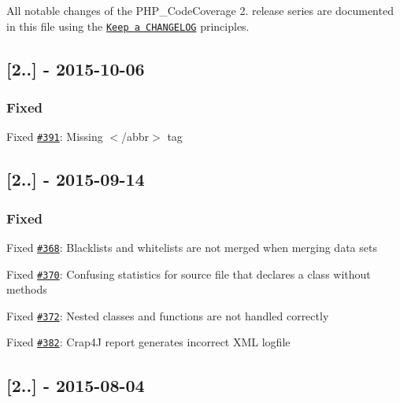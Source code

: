 All notable changes of the P\+H\+P\+\_\+\+Code\+Coverage 2. release series are documented in this file using the \href{http://keepachangelog.com/}{\tt Keep a C\+H\+A\+N\+G\+E\+L\+OG} principles.

\subsection*{\mbox{[}2..\mbox{]} -\/ 2015-\/10-\/06}

\subsubsection*{Fixed}


\begin{DoxyItemize}
\item Fixed \href{https://github.com/sebastianbergmann/php-code-coverage/pull/391}{\tt \#391}\+: Missing {\ttfamily $<$/abbr$>$} tag
\end{DoxyItemize}

\subsection*{\mbox{[}2..\mbox{]} -\/ 2015-\/09-\/14}

\subsubsection*{Fixed}


\begin{DoxyItemize}
\item Fixed \href{https://github.com/sebastianbergmann/php-code-coverage/pull/368}{\tt \#368}\+: Blacklists and whitelists are not merged when merging data sets
\item Fixed \href{https://github.com/sebastianbergmann/php-code-coverage/issues/370}{\tt \#370}\+: Confusing statistics for source file that declares a class without methods
\item Fixed \href{https://github.com/sebastianbergmann/php-code-coverage/pull/372}{\tt \#372}\+: Nested classes and functions are not handled correctly
\item Fixed \href{https://github.com/sebastianbergmann/php-code-coverage/issues/382}{\tt \#382}\+: Crap4J report generates incorrect X\+ML logfile
\end{DoxyItemize}

\subsection*{\mbox{[}2..\mbox{]} -\/ 2015-\/08-\/04}

